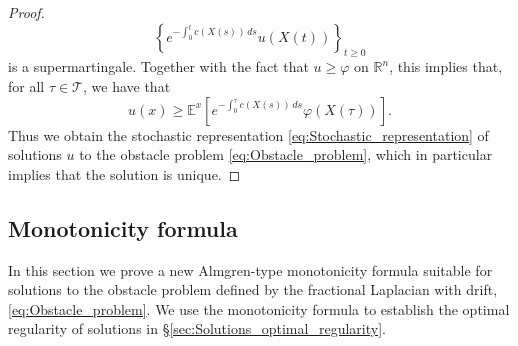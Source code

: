 \documentclass[11pt,reqno]{amsart}
\theoremstyle{definition}
\theoremstyle{remark}
\begin{document}
\begin{proof}
$$
\left\{e^{-\int_0^{t} c(X(s))\, ds} u(X(t))\right\}_{t\geq 0}
$$
is a supermartingale. Together with the fact that $u\geq \varphi$ on ${\mathbb{R}}^n$, this implies that, for all $\tau\in{{\mathcal{T}}}$, we have that
$$
u(x)\geq {\mathbb{E}}^x\left[e^{-\int_0^{\tau} c(X(s))\, ds} \varphi(X(\tau))\right].
$$
Thus we obtain the stochastic representation \eqref{eq:Stochastic_representation} of solutions $u$ to the obstacle problem \eqref{eq:Obstacle_problem}, which in particular implies that the solution is unique.
\end{proof}

\subsection{Monotonicity formula}
\label{sec:Monotonicity_formula}
In this section we prove a new Almgren-type monotonicity formula suitable for solutions to the obstacle problem defined by the fractional Laplacian with drift, \eqref{eq:Obstacle_problem}. We use the monotonicity formula to establish the optimal regularity of solutions in \S \ref{sec:Solutions_optimal_regularity}. 
\end{document}
